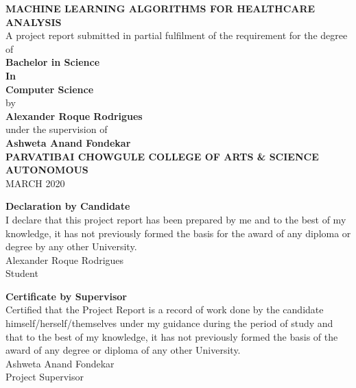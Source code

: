 \documentclass[12pt]{article}
\begin{document}
\begin{titlepage}
\newcommand{\HRule}{\rule{\linewidth}{0.5mm}} 
\center
\doublespacing
\textbf{\Huge MACHINE LEARNING ALGORITHMS FOR HEALTHCARE ANALYSIS}
\\
\singlespacing
\Large
\vspace{3cm}
A project report submitted in partial fulfilment of the requirement for the degree of\\
\vspace{1cm}
\textbf{Bachelor in Science\\In\\Computer Science}
\\by\\
\vspace{1cm}
\textbf{Alexander Roque Rodrigues}
\\
\normalsize
\vspace{1cm}
under the supervision of
\vspace{1cm}
\\
\LARGE
\textbf{Ashweta Anand Fondekar}
\\
\vspace{3cm}
\Large
\textbf{PARVATIBAI CHOWGULE COLLEGE OF ARTS \& SCIENCE AUTONOMOUS}
\\MARCH 2020
\end{titlepage}

\onehalfspacing
\newpage
\vspace{15cm}
\begin{center}
\Huge{\textbf{Declaration by Candidate}}\\
\normalsize
\vspace{5cm}
I declare that this project report has been prepared by me and to the best of my
knowledge, it has not previously formed the basis for the award of any diploma or degree by
any other University.\\
\vspace{5cm}
Alexander Roque Rodrigues\\

Student
\end{center}
\newpage
\vspace{15cm}

\begin{center}
\Huge{\textbf{Certificate by Supervisor}}\\
\normalsize
\vspace{5cm}
Certified that the Project Report is a record of work done by the candidate himself/herself/themselves under my guidance during the period of study and that to the best of my knowledge, it has not previously formed the basis of the award of any degree or diploma of any other University.\\
\vspace{5cm}
Ashweta Anand Fondekar\\

Project Supervisor
\end{center}
\end{document}
